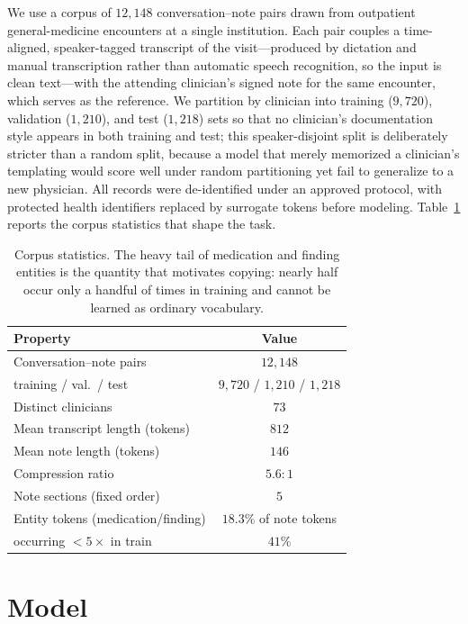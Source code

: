 \documentclass{article}
\begin{document}
We use a corpus of $12{,}148$ conversation--note pairs drawn from outpatient
general-medicine encounters at a single institution. Each pair couples a
time-aligned, speaker-tagged transcript of the visit---produced by dictation and
manual transcription rather than automatic speech recognition, so the input is clean
text---with the attending clinician's signed note for the same encounter, which
serves as the reference. We partition by clinician into training ($9{,}720$),
validation ($1{,}210$), and test ($1{,}218$) sets so that no clinician's
documentation style appears in both training and test; this speaker-disjoint split is
deliberately stricter than a random split, because a model that merely memorized a
clinician's templating would score well under random partitioning yet fail to
generalize to a new physician. All records were de-identified under an approved
protocol, with protected health identifiers replaced by surrogate tokens before
modeling. Table~\ref{tab:corpus} reports the corpus statistics that shape the task.

\begin{table}[t]
\caption{Corpus statistics. The heavy tail of medication and finding entities is the
quantity that motivates copying: nearly half occur only a handful of times in
training and cannot be learned as ordinary vocabulary.}
\label{tab:corpus}
\centering
\small
\begin{tabular}{lc}
\toprule
Property & Value \\
\midrule
Conversation--note pairs            & $12{,}148$ \\
\quad training / val.\ / test       & $9{,}720$ / $1{,}210$ / $1{,}218$ \\
Distinct clinicians                 & $73$ \\
Mean transcript length (tokens)     & $812$ \\
Mean note length (tokens)           & $146$ \\
Compression ratio                   & $5.6{:}1$ \\
Note sections (fixed order)         & $5$ \\
Entity tokens (medication/finding)  & $18.3\%$ of note tokens \\
\quad occurring $<5\times$ in train & $41\%$ \\
\bottomrule
\end{tabular}
\end{table}

\section{Model}
\end{document}
